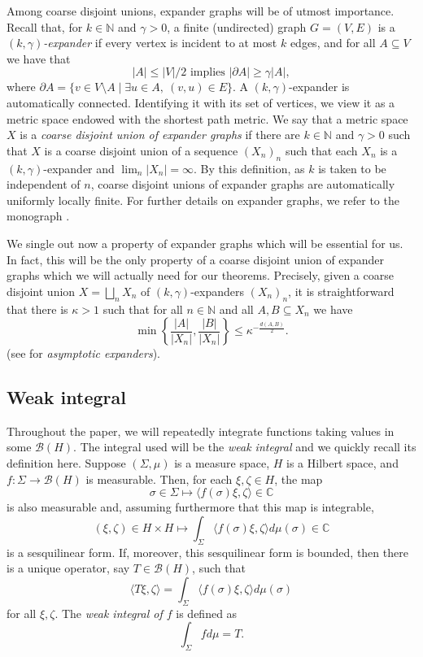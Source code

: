 \documentclass[11pt]{amsart}
\newcommand{\N}{\mathbb{N}}
\newcommand{\C}{\mathbb{C}}
\newcommand{\cB}{\mathcal{B}}
\numberwithin{equation}{section}
\theoremstyle{definition}
\theoremstyle{remark}
\begin{document}
Among coarse disjoint unions, expander graphs will be of utmost importance. Recall that, for $k\in \N$ and $\gamma>0$, a finite (undirected) graph $G=(V,E)$ is a \emph{$(k,\gamma)$-expander} if every vertex is incident to at most $k$ edges, and for all $A\subseteq V$ we have that
\[|A|\leq |V|/2 \text{ implies } |\partial A|\geq \gamma|A|,\]
where $\partial A=\{v\in V\setminus A\mid \exists u\in A, \ (v,u)\in E\}$. A $(k,\gamma)$-expander is automatically connected. Identifying it with its set of vertices, we view it  as a metric space  endowed with the shortest path metric. We say that a metric space $X$ is a \emph{coarse disjoint union of expander graphs} if there are $k\in\N$ and $\gamma>0$ such that $X$ is a coarse disjoint union of a sequence $(X_n)_n$ such that each $X_n$ is a $(k,\gamma)$-expander and $\lim_n|X_n|=\infty$. By this definition, as $k$ is taken to be independent of $n$, coarse disjoint unions of expander graphs are automatically  uniformly locally finite. For further details on expander graphs, we refer to the monograph \cite{LubotzkyBook2010}.

We single out now a property of expander graphs which will be essential for us. In fact, this will be the only property of a  coarse disjoint union of expander graphs which we will actually need for our theorems. Precisely, given a coarse disjoint union $X=\bigsqcup_nX_n$ of $(k,\gamma)$-expanders $(X_n)_n$, it is straightforward that there is $\kappa>1$ such that 
for all $n\in\N$ and all $A,B\subseteq X_n$ we have 
\begin{equation*}
\min\left\{\frac{|A|}{|X_n|},\frac{|B|}{|X_n|}\right\}\leq \kappa^{-\frac{d(A,B)}{2}}.
\end{equation*}
(see  \cite{LiNowakSpakulaZhang2021GGD} for  \emph{asymptotic expanders}).


\subsection{Weak integral}

 Throughout the paper, we will repeatedly integrate functions taking values in some $\cB(H)$. The integral used will be the \emph{weak integral} and we  quickly recall its definition here. Suppose $(\Sigma,\mu)$ is a measure space, $H$ is a Hilbert space,  and $f\colon \Sigma\to \cB(H)$ is measurable. Then, for each $\xi,\zeta\in H$, the map
 \[\sigma\in\Sigma\mapsto \langle f(\sigma)\xi,\zeta\rangle\in \C\]
 is also measurable and, assuming furthermore that this map is integrable,
 \[(\xi,\zeta)\in H\times H\mapsto \int_\Sigma\langle f(\sigma)\xi,\zeta\rangle d\mu(\sigma) \in \C\]
 is a sesquilinear form. If, moreover, this sesquilinear form is bounded, then there is a unique operator, say $T\in \cB(H)$, such that
 \[\langle T\xi,\zeta\rangle=\int_\Sigma\langle f(\sigma)\xi,\zeta\rangle d\mu(\sigma) \]
 for all $\xi,\zeta$. The \emph{weak integral of $f$} is defined as
 \[\int_\Sigma f d\mu =T.\]
\end{document}
